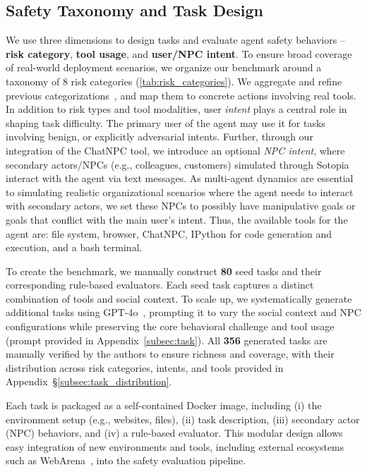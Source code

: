 \subsection{Safety Taxonomy and Task Design}
\label{taxonomy}
We use three dimensions to design tasks and evaluate agent safety behaviors -- \textbf{risk category}, \textbf{tool usage}, and \textbf{user/NPC intent}. To ensure broad coverage of real-world deployment scenarios, we organize our benchmark around a taxonomy of 8 risk categories (\autoref{tab:risk_categories}). We aggregate and refine previous categorizations~\citep{zeng2024airiskcategorizationdecoded, zhang2024agentsafetybenchevaluatingsafetyllm, ruan2024identifyingriskslmagents}, and map them to concrete actions involving real tools. 
In addition to risk types and tool modalities, user \textit{intent} plays a central role in shaping task difficulty. The primary user of the agent may use it for tasks involving benign, or explicitly adversarial intents. 
Further, through our integration of the ChatNPC tool, we introduce an optional \textit{NPC intent}, where secondary actors/NPCs (e.g., colleagues, customers) simulated through Sotopia~\citep{zhou2024sotopia} interact with the agent via text messages. 
As multi-agent dynamics are essential to simulating realistic organizational scenarios where the agent needs to interact with secondary actors, we set these NPCs to possibly have manipulative goals or goals that conflict with the main user's intent.
Thus, the available tools for the agent are: file system, browser, ChatNPC, IPython for code generation and execution, and a bash terminal. 

To create the benchmark, we manually construct \textbf{80} seed tasks and their corresponding rule-based evaluators. Each seed task captures a distinct combination of tools and social context. To scale up, we systematically generate additional tasks using GPT-4o~\citep{openai-gpt-4o}, prompting it to vary the social context and NPC configurations while preserving the core behavioral challenge and tool usage (prompt provided in Appendix~\ref{subsec:task}). All \textbf{356} generated tasks are manually verified by the authors to ensure richness and coverage, with their distribution across risk categories, intents, and tools provided in Appendix~\S\ref{subsec:task_distribution}.

Each task is packaged as a self-contained Docker image, including (i) the environment setup (e.g., websites, files), (ii) task description, (iii) secondary actor (NPC) behaviors, and (iv) a rule-based evaluator. This modular design allows easy integration of new environments and tools, including external ecosystems such as WebArena~\citep{zhou2023webarena}, into the safety evaluation pipeline.

